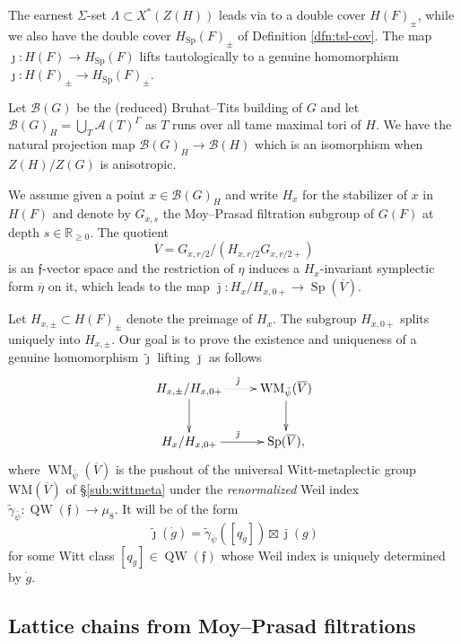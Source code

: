 \documentclass{article}
\def\mc#1{\mathcal{#1}}
\def\ol#1{\overline{#1}}
\newcommand{\cB}{\mathcal{B}}
\newcommand{\bR}{\mathbb{R}}
\DeclareMathOperator{\Sp}{Sp}
\theoremstyle{definition}
\numberwithin{equation}{subsection}
\renewcommand{\-}{\hyp{}}
\DeclareMathOperator{\WM}{WM}
\newcommand{\WMuniv}{\mathrm{WM}}
\DeclareMathOperator{\QW}{QW}
\newcommand{\rf}{\mathfrak{f}}
\newcommand{\oV}{\ol{V}}
\begin{document}
The earnest $\Sigma$-set $\Lambda \subset X^*(Z(H))$ leads via \cite[\S6]{KalDC} to a double cover $H(F)_\pm$, while we also have the double cover $H_{\Sp}(F)_\pm$ of Definition \ref{dfn:tsl-cov}. The map $\jmath : H(F) \to H_{\Sp}(F)$ lifts tautologically to a genuine homomorphism $\jmath : H(F)_\pm \to H_{\Sp}(F)_\pm$.

Let $\mc{B}(G)$ be the (reduced) Bruhat--Tits building of $G$ and let $\mc{B}(G)_H = \bigcup_T \mc{A}(T)^\Gamma$ as $T$ runs over all tame maximal tori of $H$. We have the natural projection map $\mc{B}(G)_H \to \mc{B}(H)$\index[notation]{BG@$\cB(G)$}\index[notation]{BGH@$\cB(G)_H$} which is an isomorphism when $Z(H)/Z(G)$ is anisotropic. 

We assume given a point $x \in \mc{B}(G)_H$ and write $H_x$ for the stabilizer of $x$ in $H(F)$ and denote by $G_{x,s}$ the Moy--Prasad filtration subgroup of $G(F)$ at depth $s \in \bR_{\geq 0}$. The quotient 
\[ \oV=G_{x,r/2}/(H_{x,r/2}G_{x,r/2+}) \]
is an $\rf$-vector space and the restriction of $\eta$ induces a $H_x$-invariant symplectic form $\ol{\eta}$ on it, which leads to the map $\bar\jmath : H_x/H_{x,0+} \to \Sp(\oV)$.

Let $H_{x,\pm} \subset H(F)_\pm$ denote the preimage of $H_x$. The subgroup $H_{x,0+}$ splits uniquely into $H_{x,\pm}$. Our goal is to prove the existence and uniqueness of a genuine homomorphism $\tilde\jmath$ lifting $\bar\jmath$ as follows \begin{equation}
	\xymatrix{
	H_{x,\pm}/H_{x,0+}\ar[d]\ar@{..>}[r]^{\tilde\jmath}&\WM_{\bar\psi}(\oV)\ar[d]\\
	H_x/H_{x,0+}\ar[r]^{\bar\jmath}&\Sp(\oV),}
\end{equation}
where $\WM_{\bar\psi}(\oV)$\index[notation]{WMpsibar@$\WM_{\bar\psi}$} is the pushout of the universal Witt-metaplectic group $\WMuniv(\oV)$ of \S\ref{sub:wittmeta} under the \emph{renormalized} Weil index $\tilde\gamma_{\bar\psi} : \QW(\rf) \to \mu_8$. It will be of the form
\[ \tilde\jmath(\dot g)=\tilde\gamma_{\bar\psi}([q_{\dot g}]) \boxtimes \bar\jmath(g) \] 
for some Witt class $[q_{\dot g}] \in \QW(\rf)$ whose Weil index is uniquely determined by $\dot g$.



\subsection{Lattice chains from Moy--Prasad filtrations}	
	
\end{document}
